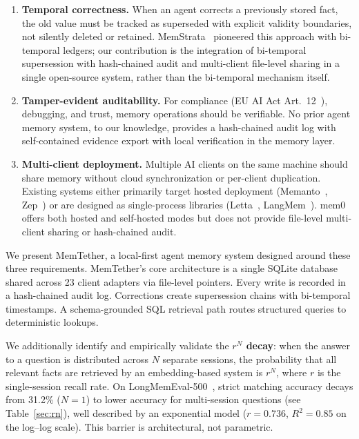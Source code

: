 \documentclass{article}
\begin{document}
\begin{enumerate}
\item \textbf{Temporal correctness.} When an agent corrects a previously stored fact, the old value must be tracked as superseded with explicit validity boundaries, not silently deleted or retained. MemStrata~\citep{memstrata} pioneered this approach with bi-temporal ledgers; our contribution is the integration of bi-temporal supersession with hash-chained audit and multi-client file-level sharing in a single open-source system, rather than the bi-temporal mechanism itself.
\item \textbf{Tamper-evident auditability.} For compliance (EU AI Act Art.~12~\citep{euaiact}), debugging, and trust, memory operations should be verifiable. No prior agent memory system, to our knowledge, provides a hash-chained audit log with self-contained evidence export with local verification in the memory layer.
\item \textbf{Multi-client deployment.} Multiple AI clients on the same machine should share memory without cloud synchronization or per-client duplication. Existing systems either primarily target hosted deployment (Memanto~\citep{memanto}, Zep~\citep{zep}) or are designed as single-process libraries (Letta~\citep{letta}, LangMem~\citep{langmem}). mem0~\citep{mem0} offers both hosted and self-hosted modes but does not provide file-level multi-client sharing or hash-chained audit.
\end{enumerate}

We present MemTether, a local-first agent memory system designed around these three requirements. MemTether's core architecture is a single SQLite database shared across 23 client adapters via file-level pointers. Every write is recorded in a hash-chained audit log. Corrections create supersession chains with bi-temporal timestamps. A schema-grounded SQL retrieval path routes structured queries to deterministic lookups.

We additionally identify and empirically validate the \textbf{$r^N$ decay}: when the answer to a question is distributed across $N$ separate sessions, the probability that all relevant facts are retrieved by an embedding-based system is $r^N$, where $r$ is the single-session recall rate. On LongMemEval-500~\citep{wu2024longmemeval}, strict matching accuracy decays from 31.2\% ($N{=}1$) to lower accuracy for multi-session questions (see Table~\ref{sec:rn}), well described by an exponential model ($r = 0.736$, $R^2 = 0.85$ on the log--log scale). This barrier is architectural, not parametric.
\end{document}
